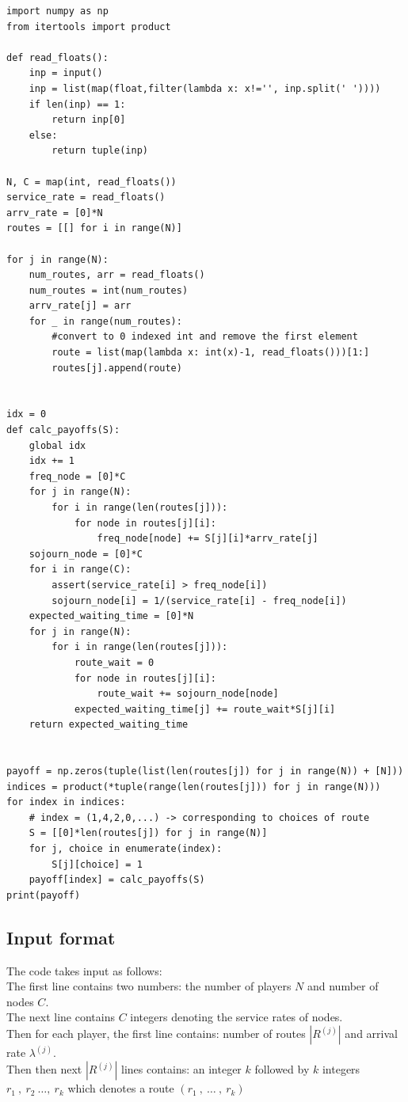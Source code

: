 \lstset{language=Python}
\lstset{frame=lines}
\lstset{basicstyle=\footnotesize}
\begin{lstlisting}
import numpy as np
from itertools import product

def read_floats():
    inp = input()
    inp = list(map(float,filter(lambda x: x!='', inp.split(' '))))
    if len(inp) == 1:
        return inp[0]
    else:
        return tuple(inp)

N, C = map(int, read_floats())
service_rate = read_floats()
arrv_rate = [0]*N
routes = [[] for i in range(N)]

for j in range(N):
    num_routes, arr = read_floats()
    num_routes = int(num_routes)
    arrv_rate[j] = arr
    for _ in range(num_routes):
        #convert to 0 indexed int and remove the first element
        route = list(map(lambda x: int(x)-1, read_floats()))[1:] 
        routes[j].append(route)


idx = 0
def calc_payoffs(S):
    global idx
    idx += 1
    freq_node = [0]*C
    for j in range(N):
        for i in range(len(routes[j])):
            for node in routes[j][i]:
                freq_node[node] += S[j][i]*arrv_rate[j]
    sojourn_node = [0]*C
    for i in range(C):
        assert(service_rate[i] > freq_node[i])
        sojourn_node[i] = 1/(service_rate[i] - freq_node[i])
    expected_waiting_time = [0]*N
    for j in range(N):
        for i in range(len(routes[j])):
            route_wait = 0
            for node in routes[j][i]:
                route_wait += sojourn_node[node]
            expected_waiting_time[j] += route_wait*S[j][i]
    return expected_waiting_time


payoff = np.zeros(tuple(list(len(routes[j]) for j in range(N)) + [N]))
indices = product(*tuple(range(len(routes[j])) for j in range(N)))
for index in indices:
    # index = (1,4,2,0,...) -> corresponding to choices of route
    S = [[0]*len(routes[j]) for j in range(N)]
    for j, choice in enumerate(index):
        S[j][choice] = 1
    payoff[index] = calc_payoffs(S)
print(payoff)
\end{lstlisting}

\subsection{Input format}
The code takes input as follows:\\
The first line contains two numbers: the number of players $N$ and number of nodes $C$.\\
The next line contains $C$ integers denoting the service rates of nodes.\\
Then for each player, the first line contains: number of routes $|R^{(j)}|$ and arrival rate $\lambda^{(j)}$.\\
Then then next $|R^{(j)}|$ lines contains: an integer $k$ followed by $k$ integers $r_1 ~ , ~ r_2 ~ \ldots, ~ r_k$ which denotes a route
$(r_1 ~ , ~ \ldots ~ , ~ r_k)$

